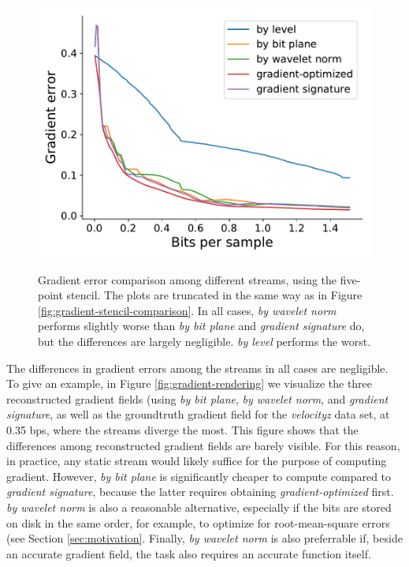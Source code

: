 \begin{figure}[h]
	{\includegraphics[width=0.48\linewidth]{img/gradient/5points/gradient-optimized-velocityz.pdf}}
	\caption{Gradient error comparison among different streams, using the five-point stencil. The
	plots are truncated in the same way as in Figure \ref{fig:gradient-stencil-comparison}. In all
	cases, \emph{by wavelet norm} performs slightly worse than \emph{by bit plane} and \emph{gradient
	signature} do, but the differences are largely negligible. \emph{by level} performs the worst.}
	\label{fig:gradient-error-comparison}
\end{figure}

The differences in gradient errors among the streams in all cases are negligible. To give an
example, in Figure \ref{fig:gradient-rendering} we visualize the three reconstructed gradient fields
(using \emph{by bit plane}, \emph{by wavelet norm}, and \emph{gradient signature}, as well as the
groundtruth gradient field for the \emph{velocityz} data set, at 0.35 bps, where the streams diverge
the most. This figure shows that the differences among reconstructed gradient fields are barely
visible. For this reason, in practice, any static stream would likely suffice for the purpose of
computing gradient. However, \emph{by bit plane} is significantly cheaper to compute compared to
\emph{gradient signature}, because the latter requires obtaining \emph{gradient-optimized} first.
\emph{by wavelet norm} is also a reasonable alternative, especially if the bits are stored on disk
in the same order, for example, to optimize for root-mean-square errors (see Section
\ref{sec:motivation}. Finally, \emph{by wavelet norm} is also preferrable if, beside an accurate
gradient field, the task also requires an accurate function itself.

